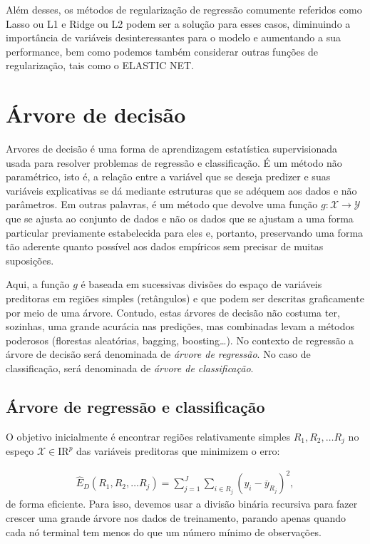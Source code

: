 \documentclass[11pt,]{article}
\begin{document}
Além desses, os métodos de regularização de regressão comumente
referidos como Lasso ou L1 e Ridge ou L2 podem ser a solução para esses
casos, diminuindo a importância de variáveis desinteressantes para o
modelo e aumentando a sua performance, bem como podemos também
considerar outras funções de regularização, tais como o ELASTIC NET.

\hypertarget{uxe1rvore-de-decisuxe3o}{%
\section{Árvore de decisão}\label{uxe1rvore-de-decisuxe3o}}

Arvores de decisão é uma forma de aprendizagem estatística
supervisionada usada para resolver problemas de regressão e
classificação. É um método não paramétrico, isto é, a relação entre a
variável que se deseja predizer e suas variáveis explicativas se dá
mediante estruturas que se adéquem aos dados e não parâmetros. Em outras
palavras, é um método que devolve uma função
\(g: \mathcal{X} \to \mathcal{Y}\) que se ajusta ao conjunto de dados e
não os dados que se ajustam a uma forma particular previamente
estabelecida para eles e, portanto, preservando uma forma tão aderente
quanto possível aos dados empíricos sem precisar de muitas suposições.

Aqui, a função \(g\) é baseada em sucessivas divisões do espaço de
variáveis preditoras em regiões simples (retângulos) e que podem ser
descritas graficamente por meio de uma árvore. Contudo, estas árvores de
decisão não costuma ter, sozinhas, uma grande acurácia nas predições,
mas combinadas levam a métodos poderosos (florestas aleatórias, bagging,
boosting\ldots). No contexto de regressão a árvore de decisão será
denominada de \textit{árvore de regressão}. No caso de classificação,
será denominada de \textit{árvore de classificação}.

\hypertarget{uxe1rvore-de-regressuxe3o-e-classificauxe7uxe3o}{%
\subsection{Árvore de regressão e
classificação}\label{uxe1rvore-de-regressuxe3o-e-classificauxe7uxe3o}}

O objetivo inicialmente é encontrar regiões relativamente simples
\(R_1, R_2,\ldots R_j\) no espeço \(\mathcal{X} \in \mathrm{I\!R}^p\)
das variáveis preditoras que minimizem o erro:

\begin{align}
\widehat{E}_D(R_1, R_2,\ldots R_j) = \sum_{j=1}^J\sum_{i \in R_j}(y_i - \overline{y}_{R_j})^2,
\end{align} de forma eficiente. Para isso, devemos usar a divisão
binária recursiva para fazer crescer uma grande árvore nos dados de
treinamento, parando apenas quando cada nó terminal tem menos do que um
número mínimo de observações.
\end{document}
